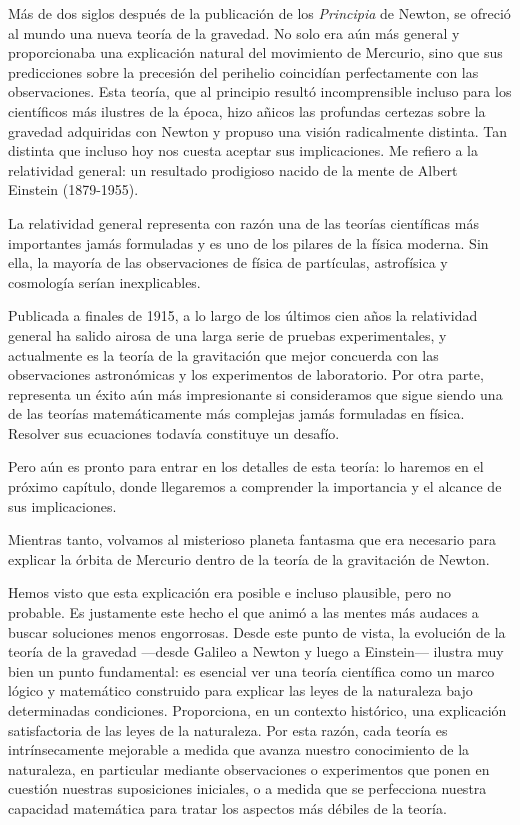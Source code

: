 Más de dos siglos después de la publicación de los \emph{Principia} de Newton,
se ofreció al mundo una nueva teoría de la gravedad. No solo era aún más general
y proporcionaba una explicación natural del movimiento de Mercurio, sino que sus
predicciones sobre la precesión del perihelio coincidían
perfectamente con las observaciones. Esta teoría, que al principio resultó
incomprensible incluso para los científicos más ilustres de la época, hizo añicos
las profundas certezas sobre la gravedad adquiridas con Newton y propuso una
visión radicalmente distinta. Tan distinta que incluso hoy nos cuesta aceptar
sus implicaciones. Me refiero a la relatividad general: un resultado prodigioso
nacido de la mente de Albert Einstein (1879-1955).

La relatividad general representa con razón una de
las teorías científicas más importantes jamás formuladas y es uno de los pilares
de la física moderna. Sin ella, la mayoría de las observaciones de física de
partículas, astrofísica y cosmología serían inexplicables.

Publicada a finales de 1915, a lo largo de los últimos cien años la relatividad
general ha salido airosa de una larga serie de pruebas
experimentales, y actualmente es la teoría de la gravitación que mejor concuerda
con las observaciones astronómicas y los experimentos de laboratorio. Por otra
parte, representa un éxito aún más impresionante si consideramos que sigue siendo
una de las teorías matemáticamente más complejas jamás formuladas en física.
Resolver sus ecuaciones todavía constituye un desafío.

Pero aún es pronto para entrar en los detalles de esta teoría: lo haremos en el
próximo capítulo, donde llegaremos a comprender la importancia y el alcance
de sus implicaciones.

Mientras tanto, volvamos al misterioso planeta fantasma que era necesario para
explicar la órbita de Mercurio dentro de la teoría de la gravitación de Newton.

Hemos visto que esta explicación era posible e incluso plausible, pero no probable.
Es justamente este hecho el que animó a las mentes más audaces a buscar soluciones
menos engorrosas. Desde este punto de vista, la evolución de la teoría de la gravedad
---desde Galileo a Newton y luego a Einstein--- ilustra muy bien un punto fundamental:
es esencial ver una teoría científica como un marco lógico y matemático construido
para explicar las leyes de la naturaleza bajo determinadas condiciones. Proporciona,
en un contexto histórico, una explicación satisfactoria de las leyes de la naturaleza.
Por esta razón, cada teoría es intrínsecamente mejorable a medida que avanza nuestro
conocimiento de la naturaleza, en particular mediante observaciones o experimentos
que ponen en cuestión nuestras suposiciones iniciales, o a medida que se perfecciona
nuestra capacidad matemática para tratar los aspectos más débiles de la teoría.

